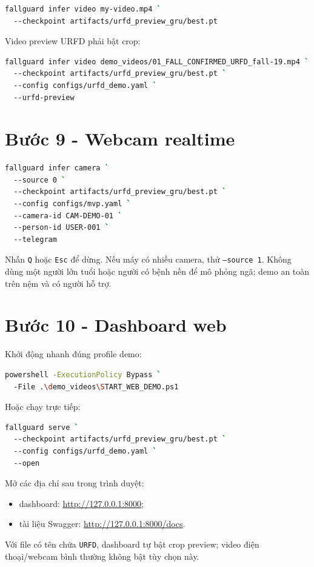 \documentclass[12pt,a4paper,oneside]{report}
\newcommand{\code}[1]{\texttt{#1}}
\begin{document}
\begin{lstlisting}[language=bash]
fallguard infer video my-video.mp4 `
  --checkpoint artifacts/urfd_preview_gru/best.pt
\end{lstlisting}

Video preview URFD phải bật crop:

\begin{lstlisting}[language=bash]
fallguard infer video demo_videos/01_FALL_CONFIRMED_URFD_fall-19.mp4 `
  --checkpoint artifacts/urfd_preview_gru/best.pt `
  --config configs/urfd_demo.yaml `
  --urfd-preview
\end{lstlisting}

\section{Bước 9 - Webcam realtime}

\begin{lstlisting}[language=bash]
fallguard infer camera `
  --source 0 `
  --checkpoint artifacts/urfd_preview_gru/best.pt `
  --config configs/mvp.yaml `
  --camera-id CAM-DEMO-01 `
  --person-id USER-001 `
  --telegram
\end{lstlisting}

Nhấn \code{Q} hoặc \code{Esc} để dừng. Nếu máy có nhiều camera, thử
\code{--source 1}. Không dùng một người lớn tuổi hoặc người có bệnh nền để mô
phỏng ngã; demo an toàn trên nệm và có người hỗ trợ.

\section{Bước 10 - Dashboard web}

Khởi động nhanh đúng profile demo:

\begin{lstlisting}[language=bash]
powershell -ExecutionPolicy Bypass `
  -File .\demo_videos\START_WEB_DEMO.ps1
\end{lstlisting}

Hoặc chạy trực tiếp:

\begin{lstlisting}[language=bash]
fallguard serve `
  --checkpoint artifacts/urfd_preview_gru/best.pt `
  --config configs/urfd_demo.yaml `
  --open
\end{lstlisting}

Mở các địa chỉ sau trong trình duyệt:
\begin{itemize}
  \item dashboard: \url{http://127.0.0.1:8000};
  \item tài liệu Swagger: \url{http://127.0.0.1:8000/docs}.
\end{itemize}
Với file có tên chứa \code{URFD}, dashboard tự bật crop preview; video điện
thoại/webcam bình thường không bật tùy chọn này.
\end{document}
